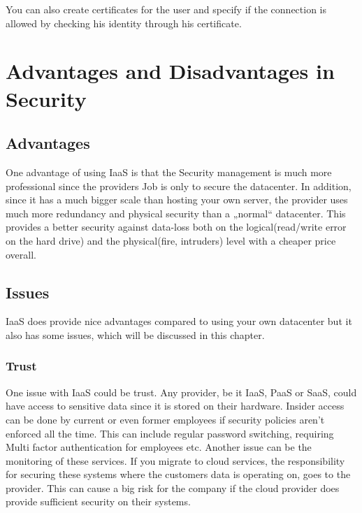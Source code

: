 You can also create certificates for the user and specify if the connection is allowed by checking his identity through his certificate. 
\cite{ssh_supp}

\section{Advantages and Disadvantages in Security}


\subsection{Advantages}
One advantage of using IaaS is that the Security management is much more professional since the providers Job is only to secure the datacenter.
In addition, since it has a much bigger scale than hosting your own server, the provider uses much more redundancy and physical security than a „normal“ datacenter. This provides a better security against data-loss both on the logical(read/write error on the hard drive) and the physical(fire, intruders) level with a cheaper price overall.
\cite{sonn_pre}

\subsection{Issues}
IaaS does provide nice advantages compared to using your own datacenter but it also has some issues, which will be discussed in this chapter.

\subsubsection{Trust}
One issue with IaaS could be trust. Any provider, be it IaaS, PaaS or SaaS, could have access to sensitive data since it is stored on their hardware. Insider access can be done by current or even former employees if security policies aren't enforced all the time. This can include regular password switching, requiring Multi factor authentication for employees etc.
Another issue can be the monitoring of these services. If you migrate to cloud services, the responsibility for securing these systems where the customers data is operating on, goes to the provider. This can cause a big risk for the company if the cloud provider does provide sufficient security on their systems.

